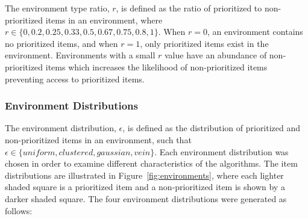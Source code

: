 \documentclass[preprint,12pt]{elsarticle}
\begin{document}
The environment type ratio, $r$, is defined as the ratio of prioritized to non-prioritized items in an environment, where $r\in \{0,\allowbreak 0.2,\allowbreak 0.25,\allowbreak 0.33,\allowbreak 0.5,\allowbreak 0.67,\allowbreak 0.75,\allowbreak 0.8, 1\}$. When $r=0$, an environment contains no prioritized items, and when $r=1$, only prioritized items exist in the environment. Environments with a small $r$ value have an abundance of non-prioritized items which increases the likelihood of non-prioritized items preventing access to prioritized items.

\subsubsection{Environment Distributions}
\label{environmentdistributions}
The environment distribution, $\epsilon$, is defined as the distribution of prioritized and non-prioritized items in an environment, such that $\epsilon\in\{uniform,\allowbreak clustered,\allowbreak gaussian,\allowbreak vein\}$. Each environment distribution was chosen in order to examine different characteristics of the algorithms. The item distributions are illustrated in Figure~\ref{fig:environments}, where each lighter shaded square is a prioritized item and a non-prioritized item is shown by a darker shaded square. The four environment distributions were generated as follows:
\end{document}
